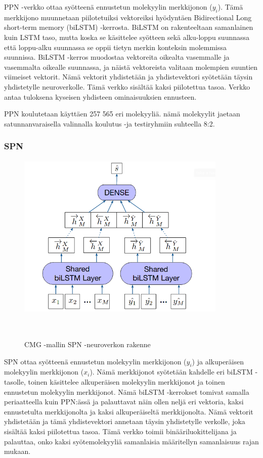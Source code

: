 \documentclass[finnish,twoside,censored,tkt,sw-line]{HYthesisML}
\begin{document}
PPN -verkko ottaa syötteenä ennustetun molekyylin merkkijonon (\(y_i\)).
Tämä merkkijono muunnetaan piilotetuiksi vektoreiksi hyödyntäen Bidirectional Long short-term memory (biLSTM) -kerrosta.
BiLSTM on rakenteeltaan samanlainen kuin LSTM taso, mutta koska se käsittelee syötteen sekä alku-loppu suunnassa että loppu-alku suunnassa se oppii tietyn merkin konteksin molemmissa suunnissa.
BiLSTM -kerros muodostaa vektoreita oikealta vasemmalle ja vasemmalta oikealle suunnassa, ja näistä vektoreista valitaan molempien suuntien viimeiset vektorit.
Nämä vektorit yhdistetään ja yhdistevektori syötetään täysin yhdistetylle neuroverkolle.
Tämä verkko sisältää kaksi piilotettua tasoa.
Verkko antaa tuloksena kyseisen yhdisteen ominaisuuksien ennusteen.

PPN koulutetaan käyttäen 257 565 eri molekyyliä.
nämä molekyylit jaetaan satunnanvaraisella valinnalla koulutus -ja testiryhmiin suhteella 8:2.

\subsubsection{SPN}

\begin{figure}[!h]
    \centering
    \includegraphics[width=10cm, height=8cm]{cmg-similarity-network.png}
    \caption{CMG -mallin SPN -neuroverkon rakenne}
    {~\cite{ShinBonggun}}
\end{figure}

SPN ottaa syötteenä ennustetun molekyylin merkkijonon (\(y_i\)) ja alkuperäisen molekyylin merkkijonon (\(x_i\)).
Nämä merkkijonot syötetään kahdelle eri biLSTM -tasolle, toinen käsittelee alkuperäisen molekyylin merkkijonot ja toinen ennustetun molekyylin merkkijonot.
Nämä biLSTM -kerrokset tomivat samalla periaatteella kuin PPN:ässä ja palauttavat näin ollen neljä eri vektoria, kaksi ennustetulta merkkijonolta ja kaksi alkuperäiseltä merkkijonolta.
Nämä vektorit yhdistetään ja tämä yhdistevektori annetaan täysin yhdistetylle verkolle, joka sisältää kaksi piilotettua tasoa.
Tämä verkko toimii binääriluokittelijana ja palauttaa, onko kaksi syötemolekyyliä samanlaisia määritellyn samanlaisuus rajan mukaan.
\end{document}
